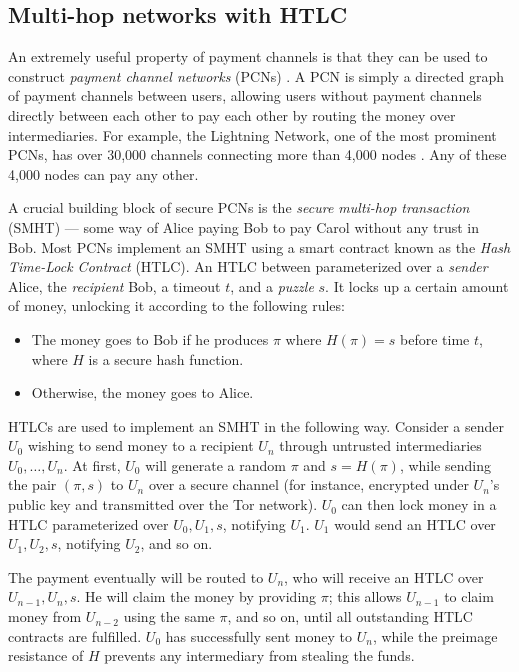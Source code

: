 \documentclass[USenglish,oneside,twocolumn]{article}
\begin{document}
\subsection{Multi-hop networks with HTLC}

An extremely useful property of payment channels is that they can be used to construct \emph{payment channel networks} (PCNs) \cite{mccorry2016towards,decker2018eltoo,croman2016scaling}. A PCN is simply a directed graph of payment channels between users, allowing users without payment channels directly between each other to pay each other by routing the money over intermediaries. For example, the Lightning Network, one of the most prominent PCNs, has over 30,000 channels connecting more than 4,000 nodes \cite{github2019lnd}. Any of these 4,000 nodes can pay any other.

A crucial building block of secure PCNs is the \emph{secure multi-hop transaction} (SMHT) --- some way of Alice paying Bob to pay Carol without any trust in Bob. Most PCNs implement an SMHT using a smart contract known as the \emph{Hash Time-Lock Contract} (HTLC). An HTLC between parameterized over a \emph{sender} Alice, the \emph{recipient} Bob, a timeout $t$, and a \emph{puzzle} $s$. It locks up a certain amount of money, unlocking it according to the following rules:
\begin{itemize}
    \item The money goes to Bob if he produces $\pi$ where $H(\pi) = s$ before time $t$, where $H$ is a secure hash function.
    \item Otherwise, the money goes to Alice.
\end{itemize}

HTLCs are used to implement an SMHT in the following way. Consider a sender $U_0$ wishing to send money to a recipient $U_n$ through untrusted intermediaries $U_0,\dots,U_n$. At first, $U_0$ will generate a random $\pi$ and $s=H(\pi)$, while sending the pair $(\pi,s)$ to $U_n$ over a secure channel (for instance, encrypted under $U_n$'s public key and transmitted over the Tor \cite{dingledine2004tor} network). $U_0$ can then lock money in a HTLC parameterized over $U_0,U_1,s$, notifying $U_1$. $U_1$ would send an HTLC over $U_1,U_2,s$, notifying $U_2$, and so on.

The payment eventually will be routed to $U_n$, who will receive an HTLC over $U_{n-1},U_n,s$. He will claim the money by providing $\pi$; this allows $U_{n-1}$ to claim money from $U_{n-2}$ using the same $\pi$, and so on, until all outstanding HTLC contracts are fulfilled. $U_0$ has successfully sent money to $U_n$, while the preimage resistance of $H$ prevents any intermediary from stealing the funds.
\end{document}
